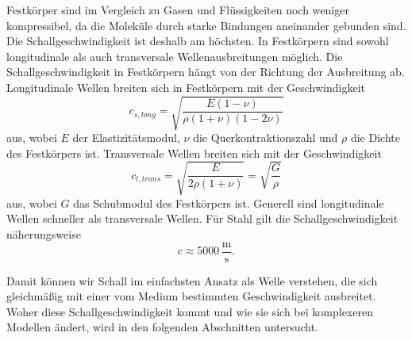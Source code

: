 Festkörper sind im Vergleich zu Gasen und Flüssigkeiten noch weniger kompressibel, da die Moleküle durch starke Bindungen aneinander gebunden sind.
Die Schallgeschwindigkeit ist deshalb am höchsten.
In Festkörpern sind sowohl longitudinale als auch transversale Wellenausbreitungen möglich.
Die Schallgeschwindigkeit in Festkörpern hängt von der Richtung der Ausbreitung ab.
Longitudinale Wellen breiten sich in Festkörpern mit der Geschwindigkeit
\begin{equation}
    c_{s,long} = \sqrt{\frac{E(1-\nu)}{\rho(1+\nu)(1-2\nu)}}
\end{equation}
aus, wobei $E$ der Elastizitätsmodul, $\nu$ die Querkontraktionszahl und $\rho$ die Dichte des Festkörpers ist.
Transversale Wellen breiten sich mit der Geschwindigkeit
\begin{equation}
    c_{l,trans} = \sqrt{\frac{E}{2\rho(1+\nu)}} = \sqrt{\frac{G}{\rho}}
\end{equation}
aus, wobei $G$ das Schubmodul des Festkörpers ist.
Generell sind longitudinale Wellen schneller als transversale Wellen.
Für Stahl gilt die Schallgeschwindigkeit näherungsweise
\begin{equation}
    c \approx 5000 \,\frac{\mathrm{m}}{\mathrm{s}}.
\end{equation}

Damit können wir Schall im einfachsten Ansatz als Welle verstehen, die sich gleichmäßig mit einer vom Medium bestimmten Geschwindigkeit ausbreitet.
Woher diese Schallgeschwindigkeit kommt und wie sie sich bei komplexeren Modellen ändert, wird in den folgenden Abschnitten untersucht.